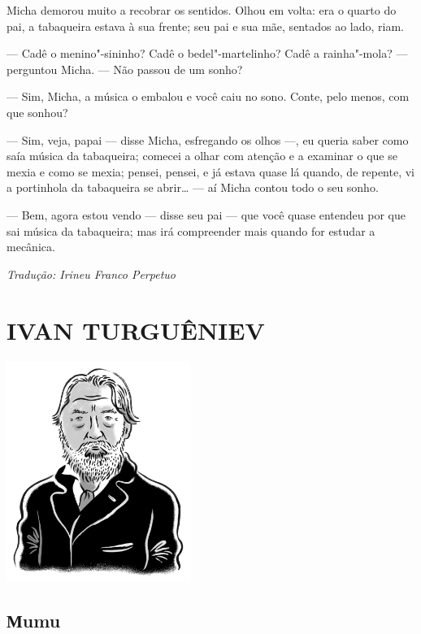 Micha demorou muito a recobrar os sentidos. Olhou em volta: era o quarto
do pai, a tabaqueira estava à sua frente; seu pai e sua mãe, sentados ao lado, riam.

--- Cadê o menino"-sininho? Cadê o bedel"-martelinho? Cadê a rainha"-mola?
--- perguntou Micha. --- Não passou de um sonho?

--- Sim, Micha, a música o embalou e você caiu no sono. Conte, pelo
menos, com que sonhou?

--- Sim, veja, papai --- disse Micha, esfregando os olhos ---, eu queria
saber como saía música da tabaqueira; comecei a olhar com atenção e a
examinar o que se mexia e como se mexia; pensei, pensei, e já estava
quase lá quando, de repente, vi a portinhola da tabaqueira se abrir\ldots{}
--- aí Micha contou todo o seu sonho.

--- Bem, agora estou vendo --- disse seu pai --- que você quase entendeu
por que sai música da tabaqueira; mas irá compreender mais quando for
estudar a mecânica.

\medskip

{\footnotesize\hfill\emph{Tradução: Irineu Franco Perpetuo}}


\part[IVAN TURGUÊNIEV]{IVAN TURGUÊNIEV }

\pagebreak
\thispagestyle{empty}
\mbox{}
\vfill
\begin{center}
\includegraphics[width=6cm]{./imgs/autor3.jpg}
\end{center}

\chapter{Мumu} \label{part3}


